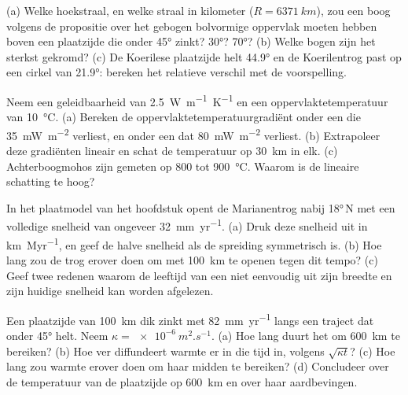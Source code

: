 \begin{exercise}[$\star\star$]\label{exo:b1:active-margins:7}
(a) Welke hoekstraal, en welke straal in kilometer ($R = \qty{6371}{km}$), zou een boog volgens de propositie over het gebogen bolvormige oppervlak moeten hebben boven een plaatzijde die onder \ang{45} zinkt? \ang{30}? \ang{70}? (b) Welke bogen zijn het sterkst gekromd? (c) De Koerilese plaatzijde helt \ang{44.9} en de Koerilentrog past op een cirkel van \ang{21.9}: bereken het relatieve verschil met de voorspelling.
\end{exercise}

\begin{exercise}[$\star\star$]\label{exo:b1:active-margins:8}
Neem een geleidbaarheid van \qty{2.5}{W.m^{-1}.K^{-1}} en een oppervlaktetemperatuur van \qty{10}{\celsius}. (a) Bereken de oppervlaktetemperatuurgradiënt onder een  die \qty{35}{mW.m^{-2}} verliest, en onder een  dat \qty{80}{mW.m^{-2}} verliest. (b) Extrapoleer deze gradiënten lineair en schat de temperatuur op \qty{30}{km} in elk. (c) Achterboogmohos zijn gemeten op 800 tot \qty{900}{\celsius}. Waarom is de lineaire schatting te hoog?
\end{exercise}

\begin{exercise}[$\star\star$]\label{exo:b1:active-margins:9}
In het plaatmodel van het hoofdstuk opent de Marianentrog nabij \ang{18}\,N met een volledige snelheid van ongeveer \qty{32}{mm.yr^{-1}}. (a) Druk deze snelheid uit in \unit{km.Myr^{-1}}, en geef de halve snelheid als de spreiding symmetrisch is. (b) Hoe lang zou de trog erover doen om met \qty{100}{km} te openen tegen dit tempo? (c) Geef twee redenen waarom de leeftijd van een  niet eenvoudig uit zijn breedte en zijn huidige snelheid kan worden afgelezen.
\end{exercise}

\begin{exercise}[$\star\star\star$]\label{exo:b1:active-margins:10}
Een plaatzijde van \qty{100}{km} dik zinkt met \qty{82}{mm.yr^{-1}} langs een traject dat onder \ang{45} helt. Neem $\kappa = \qty{e-6}{m^2.s^{-1}}$. (a) Hoe lang duurt het om \qty{600}{km} te bereiken? (b) Hoe ver diffundeert warmte er in die tijd in, volgens $\sqrt{\kappa t}$? (c) Hoe lang zou warmte erover doen om haar midden te bereiken? (d) Concludeer over de temperatuur van de plaatzijde op \qty{600}{km} en over haar aardbevingen.
\end{exercise}

